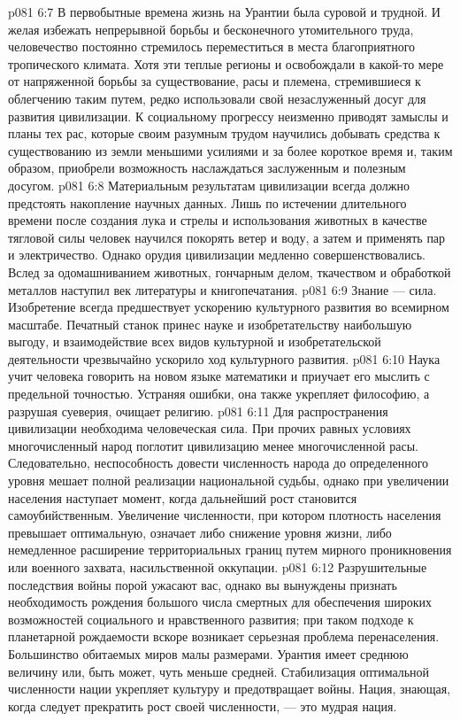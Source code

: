 \vs p081 6:7 В первобытные времена жизнь на Урантии была суровой и трудной. И желая избежать непрерывной борьбы и бесконечного утомительного труда, человечество постоянно стремилось переместиться в места благоприятного тропического климата. Хотя эти теплые регионы и освобождали в какой\hyp{}то мере от напряженной борьбы за существование, расы и племена, стремившиеся к облегчению таким путем, редко использовали свой незаслуженный досуг для развития цивилизации. К социальному прогрессу неизменно приводят замыслы и планы тех рас, которые своим разумным трудом научились добывать средства к существованию из земли меньшими усилиями и за более короткое время и, таким образом, приобрели возможность наслаждаться заслуженным и полезным досугом.
\vs p081 6:8 \pc {}\bibnobreakspace {} Материальным результатам цивилизации всегда должно предстоять накопление научных данных. Лишь по истечении длительного времени после создания лука и стрелы и использования животных в качестве тягловой силы человек научился покорять ветер и воду, а затем и применять пар и электричество. Однако орудия цивилизации медленно совершенствовались. Вслед за одомашниванием животных, гончарным делом, ткачеством и обработкой металлов наступил век литературы и книгопечатания.
\vs p081 6:9 Знание --- сила. Изобретение всегда предшествует ускорению культурного развития во всемирном масштабе. Печатный станок принес науке и изобретательству наибольшую выгоду, и взаимодействие всех видов культурной и изобретательской деятельности чрезвычайно ускорило ход культурного развития.
\vs p081 6:10 Наука учит человека говорить на новом языке математики и приучает его мыслить с предельной точностью. Устраняя ошибки, она также укрепляет философию, а разрушая суеверия, очищает религию.
\vs p081 6:11 \pc {}\bibnobreakspace {} Для распространения цивилизации необходима человеческая сила. При прочих равных условиях многочисленный народ поглотит цивилизацию менее многочисленной расы. Следовательно, неспособность довести численность народа до определенного уровня мешает полной реализации национальной судьбы, однако при увеличении населения наступает момент, когда дальнейший рост становится самоубийственным. Увеличение численности, при котором плотность населения превышает оптимальную, означает либо снижение уровня жизни, либо немедленное расширение территориальных границ путем мирного проникновения или военного захвата, насильственной оккупации.
\vs p081 6:12 Разрушительные последствия войны порой ужасают вас, однако вы вынуждены признать необходимость рождения большого числа смертных для обеспечения широких возможностей социального и нравственного развития; при таком подходе к планетарной рождаемости вскоре возникает серьезная проблема перенаселения. Большинство обитаемых миров малы размерами. Урантия имеет среднюю величину или, быть может, чуть меньше средней. Стабилизация оптимальной численности нации укрепляет культуру и предотвращает войны. Нация, знающая, когда следует прекратить рост своей численности, --- это мудрая нация.
